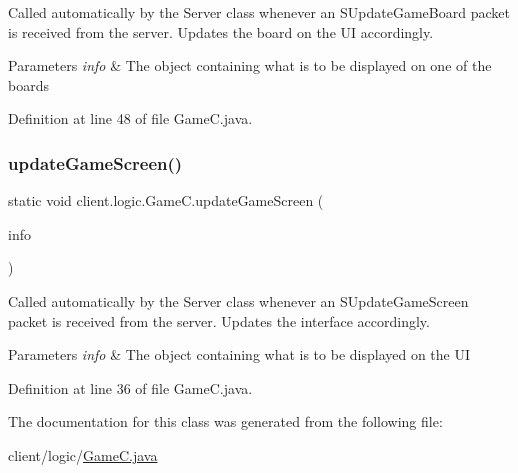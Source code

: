 Called automatically by the {\ttfamily Server} class whenever an {\ttfamily S\+Update\+Game\+Board} packet is received from the server. Updates the board on the UI accordingly.


\begin{DoxyParams}{Parameters}
{\em info} & The object containing what is to be displayed on one of the boards \\
\hline
\end{DoxyParams}


Definition at line 48 of file Game\+C.\+java.

\hypertarget{classclient_1_1logic_1_1_game_c_ae6dfcbeab229817e2e0717ed0bcc2996}{}\label{classclient_1_1logic_1_1_game_c_ae6dfcbeab229817e2e0717ed0bcc2996} 
\subsubsection{\texorpdfstring{update\+Game\+Screen()}{updateGameScreen()}}
{\footnotesize\ttfamily static void client.\+logic.\+Game\+C.\+update\+Game\+Screen (\begin{DoxyParamCaption}\item[{\hyperlink{classsharedlib_1_1tuples_1_1_game_screen_info}{Game\+Screen\+Info}}]{info }\end{DoxyParamCaption})\hspace{0.3cm}{\ttfamily [static]}}

Called automatically by the {\ttfamily Server} class whenever an {\ttfamily S\+Update\+Game\+Screen} packet is received from the server. Updates the interface accordingly.


\begin{DoxyParams}{Parameters}
{\em info} & The object containing what is to be displayed on the UI \\
\hline
\end{DoxyParams}


Definition at line 36 of file Game\+C.\+java.



The documentation for this class was generated from the following file\+:\begin{DoxyCompactItemize}
\item 
client/logic/\hyperlink{_game_c_8java}{Game\+C.\+java}\end{DoxyCompactItemize}
